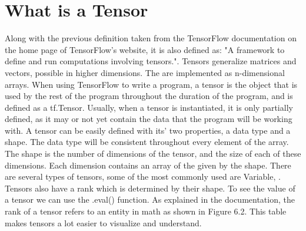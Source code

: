 \documentclass[12pt]{report} %
\begin{document}
\section{What is a Tensor}
	Along with the previous definition taken from the TensorFlow documentation on the home page of TensorFlow's website, it is also defined as: "A framework to define and run computations involving tensors."\cite{tensorFlow}. Tensors generalize matrices and vectors, possible in higher dimensions. The are implemented as n-dimensional arrays. When using TensorFlow to write a program, a tensor is the object that is used by the rest of the program throughout the duration of the program, and is defined as a tf.Tensor. Usually, when a tensor is instantiated, it is only partially defined, as it may or not yet contain the data that the program will be working with. A tensor can be easily defined with its' two properties, a data type and a shape\cite{tensorFlow}.
	The data type will be consistent throughout every element of the array. The shape is the number of dimensions of the tensor, and the size of each of these dimensions. Each dimension contains an array of the given by the shape. There are several types of tensors, some of the most commonly used are Variable, . Tensors also have a rank which is determined by their shape. To see the value of a tensor we can use the .eval() function. As explained in the documentation, the rank of a tensor refers to an entity in math as shown in Figure 6.2. This table makes tensors a lot easier to visualize and understand\cite{tensorFlow}.
\end{document}
